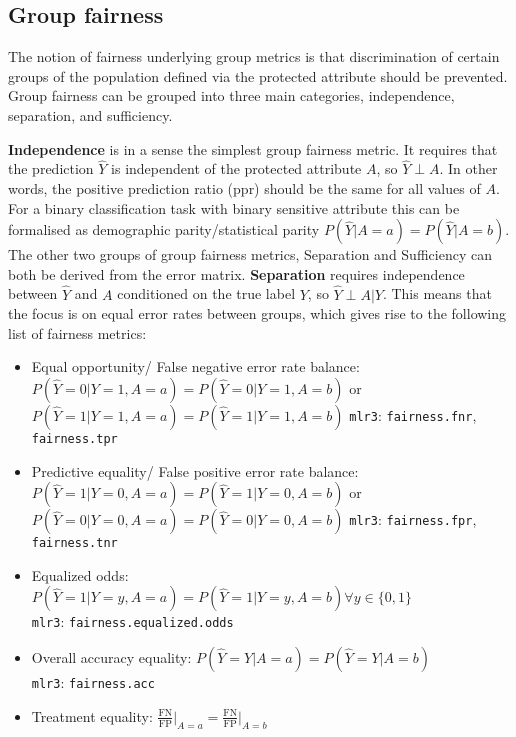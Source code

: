 \subsection*{Group fairness}
The notion of fairness underlying group metrics is that discrimination of certain groups of the population defined via the protected attribute should be prevented. Group fairness can be grouped into three main categories, independence, separation, and sufficiency. 

\textbf{Independence} is in a sense the simplest group fairness metric. It requires that the prediction $\hat{Y}$ is independent of the protected attribute $A$, so $\hat{Y} \perp A$. In other words, the positive prediction ratio (ppr) should be the same for all values of $A$. For a binary classification task with binary sensitive attribute this can be formalised as demographic parity/statistical parity $P(\hat{Y} | A = a) = P(\hat{Y} | A = b)$.
The other two groups of group fairness metrics, Separation and Sufficiency can both be derived from the error matrix.
\textbf{Separation} requires independence between $\hat{Y}$ and $A$ conditioned on the true label $Y$, so $\hat{Y} \perp A | Y$. This means that the focus is on equal error rates between groups, which gives rise to the following list of fairness metrics:
\begin{itemize}
    \item Equal opportunity/ False negative error rate balance: $P(\hat{Y} = 0 | Y = 1, A = a) = P(\hat{Y} = 0 | Y = 1, A = b)$ or $P(\hat{Y} = 1 | Y = 1, A = a) = P(\hat{Y} = 1 | Y = 1, A = b)$ \texttt{mlr3}: \texttt{fairness.fnr}, \texttt{fairness.tpr}
    \item Predictive equality/ False positive error rate balance: $P(\hat{Y} = 1 | Y = 0, A = a) = P(\hat{Y} = 1 | Y = 0, A = b)$ or \\ $P(\hat{Y} = 0 | Y = 0, A = a) = P(\hat{Y} = 0 | Y = 0, A = b)$ \texttt{mlr3}: \texttt{fairness.fpr}, \texttt{fairness.tnr}
    \item Equalized odds: $P(\hat{Y} = 1 | Y = y, A = a) = P(\hat{Y} = 1 | Y = y, A = b) \forall y \in \{0, 1\}$ \\ \texttt{mlr3}: \texttt{fairness.equalized.odds}
    \item Overall accuracy equality: $P(\hat{Y} = Y | A = a) = P(\hat{Y} = Y | A = b)$ \\ \texttt{mlr3}: \texttt{fairness.acc}
    \item Treatment equality: $\frac{\text{FN}}{\text{FP}} \big|_{A = a} = \frac{\text{FN}}{\text{FP}} \big|_{A = b}$
\end{itemize}

